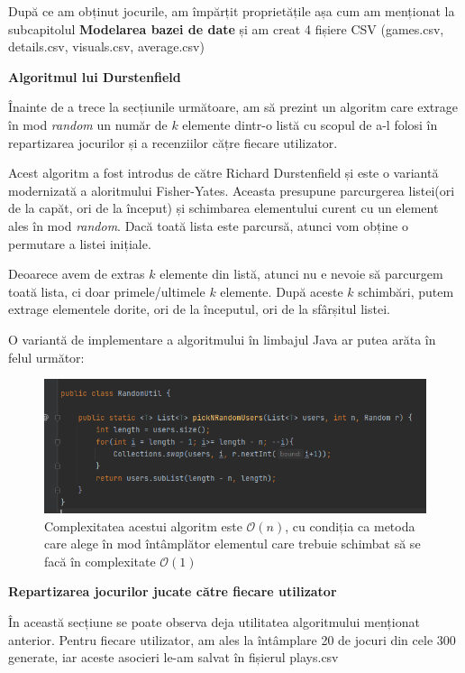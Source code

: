 \documentclass[12pt,a4paper]{report}
\begin{document}
După ce am obținut jocurile, am împărțit proprietățile așa cum am menționat la subcapitolul \textbf{Modelarea bazei de date} și am creat 4 fișiere CSV (games.csv, details.csv, visuals.csv, average.csv)

\bigskip
\textbf{Algoritmul lui Durstenfield}
\bigskip

Înainte de a trece la secțiunile următoare, am să prezint un algoritm care extrage în mod \emph{random} un număr de \( k\) elemente dintr-o listă cu scopul de a-l folosi în repartizarea jocurilor și a recenziilor cățre fiecare utilizator.

Acest algoritm a fost introdus de către Richard Durstenfield și este o variantă modernizată a aloritmului Fisher-Yates. \cite{16} Aceasta presupune parcurgerea listei(ori de la capăt, ori de la început) și schimbarea elementului curent cu un element ales în mod \emph{random}. Dacă toată lista este parcursă, atunci vom obține o permutare a listei inițiale.

Deoarece avem de extras \( k \) elemente din listă, atunci nu e nevoie să parcurgem toată lista, ci doar primele/ultimele \( k \) elemente. După aceste \( k \) schimbări, putem extrage elementele dorite, ori de la începutul, ori de la sfârșitul listei.

O variantă de implementare a algoritmului în limbajul Java ar putea arăta în felul următor:

\begin{figure}[H]
\centering
\caption{}
\includegraphics[scale = 0.8]{exemplu_11_random}
\caption*{Complexitatea acestui algoritm este \(\mathcal{O}(n) \), cu condiția ca metoda care alege în mod întâmplător elementul care trebuie schimbat să se facă în complexitate \(\mathcal{O}(1) \) }
\end{figure}

\bigskip
\textbf{Repartizarea jocurilor jucate către fiecare utilizator}
\bigskip

În această secțiune se poate observa deja utilitatea algoritmului menționat anterior. Pentru fiecare utilizator, am ales la întâmplare 20 de jocuri din cele 300 generate, iar aceste asocieri le-am salvat în fișierul plays.csv
\end{document}
